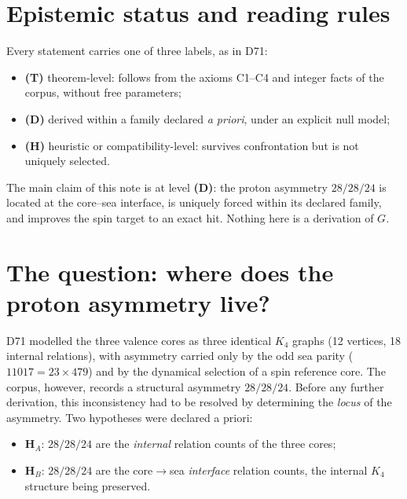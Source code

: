 \documentclass[11pt,a4paper]{article}
\begin{document}
\section{Epistemic status and reading rules}
Every statement carries one of three labels, as in D71:
\begin{itemize}[leftmargin=1.6em]
\item \textbf{(T)} theorem-level: follows from the axioms C1--C4 and integer facts of the corpus, without free parameters;
\item \textbf{(D)} derived within a family declared \emph{a priori}, under an explicit null model;
\item \textbf{(H)} heuristic or compatibility-level: survives confrontation but is not uniquely selected.
\end{itemize}
The main claim of this note is at level \textbf{(D)}: the proton asymmetry $28/28/24$ is located at the core--sea interface, is uniquely forced within its declared family, and improves the spin target to an exact hit. Nothing here is a derivation of $G$.

\section{The question: where does the proton asymmetry live?}
D71 modelled the three valence cores as three identical $K_4$ graphs (12 vertices, 18 internal relations), with asymmetry carried only by the odd sea parity ($11017 = 23 \times 479$) and by the dynamical selection of a spin reference core. The corpus, however, records a structural asymmetry $28/28/24$. Before any further derivation, this inconsistency had to be resolved by determining the \emph{locus} of the asymmetry. Two hypotheses were declared a priori:
\begin{itemize}[leftmargin=1.6em]
\item \textbf{H$_A$}: $28/28/24$ are the \emph{internal} relation counts of the three cores;
\item \textbf{H$_B$}: $28/28/24$ are the core$\to$sea \emph{interface} relation counts, the internal $K_4$ structure being preserved.
\end{itemize}
\end{document}
